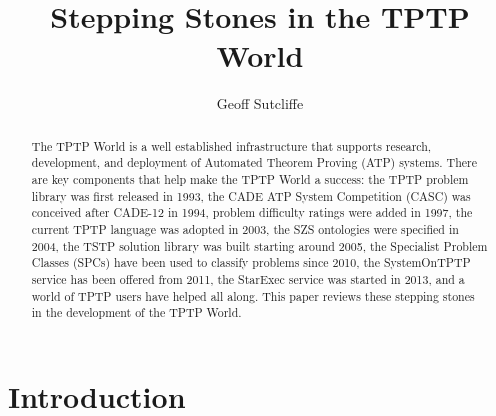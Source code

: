 \documentclass[runningheads]{llncs}
\title{Stepping Stones in the TPTP World}
\author{
  Geoff Sutcliffe\orcidID{0000-0001-9120-3927}\Envelope
}
\institute{
  University of Miami,
  Miami, USA\\
  \email{geoff@cs.miami.edu}\\
}
\begin{document}
\maketitle

\begin{abstract}
The TPTP World is a well established infrastructure that supports research, development, and 
deployment of Automated Theorem Proving (ATP) systems.
There are key components that help make the TPTP World a success: 
the TPTP problem library was first released in 1993,
the CADE ATP System Competition (CASC) was conceived after CADE-12 in 1994, 
problem difficulty ratings were added in 1997, 
the current TPTP language was adopted in 2003, 
the SZS ontologies were specified in 2004, 
the TSTP solution library was built starting around 2005, 
the Specialist Problem Classes (SPCs) have been used to classify problems since 2010, 
the SystemOnTPTP service has been offered from 2011, 
the StarExec service was started in 2013,
and 
a world of TPTP users have helped all along.
This paper reviews these stepping stones in the development of the TPTP World.
\end{abstract}
\section{Introduction}
\label{Introduction}
\end{document}
